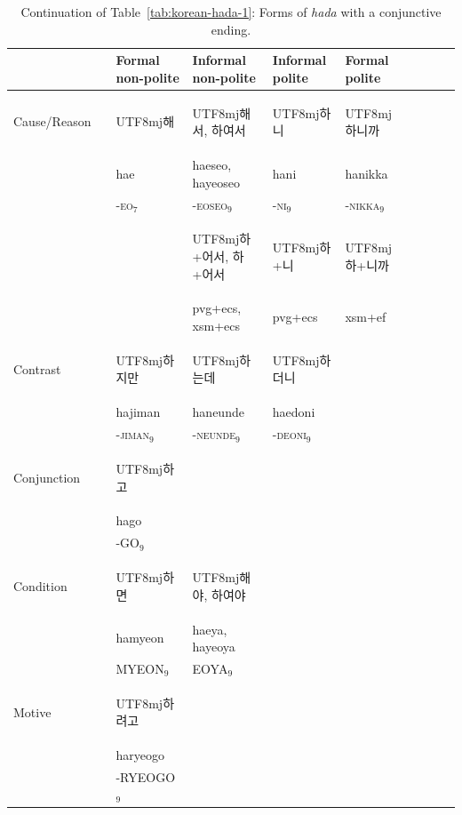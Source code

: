 \documentclass[11pt,letterpaper]{article}
\newcommand{\korean}[1]{\begin{CJK}{UTF8}{mj}#1\end{CJK}}
\begin{document}
\begin{table}
\begin{tabular}{llllllllll}
           &          &Formal non-polite & Informal non-polite & Informal polite & Formal polite \\ \hline \hline
Cause/Reason && \korean{해} & \korean{해서, 하여서} & \korean{하니} & \korean{하니까} \\
&& hae & haeseo, hayeoseo & hani & hanikka \\ 
&& -\textsc{eo}$_7$ & -\textsc{eoseo}$_9$ & -\textsc{ni}$_9$ & -\textsc{nikka}$_9$ \\
&& &\korean{하+어서, 하+어서} & \korean{하+니} & \korean{하+니까} \\
&& & pvg+ecs, xsm+ecs         & pvg+ecs & xsm+ef \\
\hline
Contrast && \korean{하지만} & \korean{하는데} & \korean{하더니} \\
 && hajiman & haneunde & haedoni & \\ 
 && -\textsc{jiman}$_9$ & -\textsc{neunde}$_9$ & -\textsc{deoni}$_9$ & \\ \hline
Conjunction && \korean{하고} \\
 && hago \\ 
&& -GO$_9$ \\ \hline
Condition && \korean{하면} & \korean{해야, 하여야} \\
&& hamyeon & haeya, hayeoya \\
&& MYEON$_9$ & EOYA$_9$ \\ \hline
Motive && \korean{하려고} \\
 && haryeogo \\
&& -RYEOGO$_9$
\end{tabular}
	\caption{Continuation of Table~\ref{tab:korean-hada-1}: Forms of \textit{hada} with a conjunctive ending.}\label{tab:korean-hada-2}
\end{table}
\end{document}
